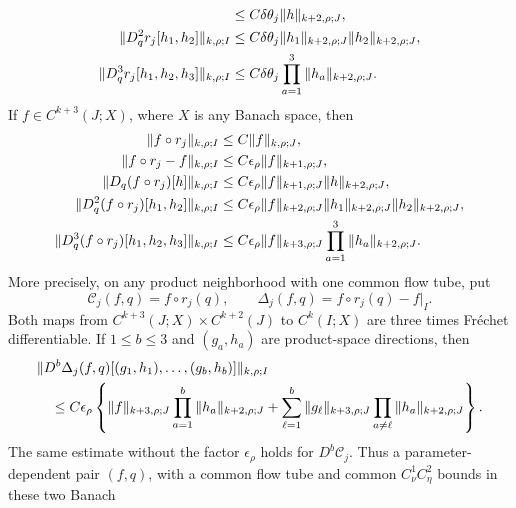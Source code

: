 \begin{proposition}
\begin{align}
 &\le C\delta\theta_j\|h\|_{k+2,\rho;J},\notag\\
 \|D_q^2r_j[h_1,h_2]\|_{k,\rho;I}
 &\le C\delta\theta_j
       \|h_1\|_{k+2,\rho;J}\|h_2\|_{k+2,\rho;J},\notag\\
 \|D_q^3r_j[h_1,h_2,h_3]\|_{k,\rho;I}
 &\le C\delta\theta_j
       \prod_{a=1}^3\|h_a\|_{k+2,\rho;J}.
                                                               \label{eq:backtrack-frechet-bounds}
\end{align}
If \(f\in C^{k+3}(J;X)\), where \(X\) is any Banach space, then
\begin{align}
 \|f\circ r_j\|_{k,\rho;I}
 &\le C\|f\|_{k,\rho;J},                           \label{eq:backtrack-composition-bound}\\
 \|f\circ r_j-f\|_{k,\rho;I}
 &\le C\epsilon_\rho\|f\|_{k+1,\rho;J},          \label{eq:backtrack-composition-difference}\\
 \|D_q(f\circ r_j)[h]\|_{k,\rho;I}
 &\le C\epsilon_\rho\|f\|_{k+1,\rho;J}
                    \|h\|_{k+2,\rho;J},\notag\\
 \|D_q^2(f\circ r_j)[h_1,h_2]\|_{k,\rho;I}
 &\le C\epsilon_\rho\|f\|_{k+2,\rho;J}
       \|h_1\|_{k+2,\rho;J}\|h_2\|_{k+2,\rho;J},\notag\\
 \|D_q^3(f\circ r_j)[h_1,h_2,h_3]\|_{k,\rho;I}
 &\le C\epsilon_\rho\|f\|_{k+3,\rho;J}
       \prod_{a=1}^3\|h_a\|_{k+2,\rho;J}.
                                                               \label{eq:backtrack-composition-frechet}
\end{align}
More precisely, on any product neighborhood with one common flow tube, put
\[
 \mathcal C_j(f,q)=f\circ r_j(q),\qquad
 \Delta_j(f,q)=f\circ r_j(q)-f|_I.
\]
Both maps from
\(C^{k+3}(J;X)\times C^{k+2}(J)\) to \(C^k(I;X)\) are three times
Fr\'{e}chet differentiable.  If \(1\le b\le3\) and
\((g_a,h_a)\) are product-space directions, then
\begin{align}
 &\|D^b\Delta_j(f,q)
       [(g_1,h_1),\ldots,(g_b,h_b)]\|_{k,\rho;I}\notag\\
 &\quad\le C\epsilon_\rho\left\{
      \|f\|_{k+3,\rho;J}\prod_{a=1}^b\|h_a\|_{k+2,\rho;J}
      +\sum_{\ell=1}^b\|g_\ell\|_{k+3,\rho;J}
          \prod_{a\ne\ell}\|h_a\|_{k+2,\rho;J}\right\}.
                                                               \label{eq:backtrack-joint-difference}
\end{align}
The same estimate without the factor \(\epsilon_\rho\) holds for
\(D^b\mathcal C_j\).  Thus a parameter-dependent pair \((f,q)\), with a
common flow tube and common \(C^1_\nu C^2_\eta\) bounds in these two Banach

\end{proposition}
